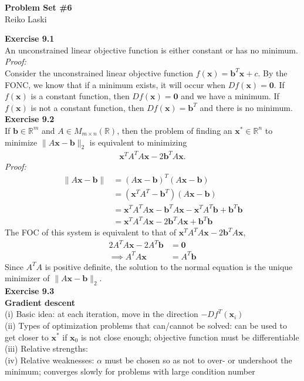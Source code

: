 \documentclass[letterpaper,12pt]{article}
\let\vec\mathbf
\theoremstyle{definition}
\begin{document}
\begin{flushleft}
  \textbf{\large{Problem Set \#6}} \\
  Reiko Laski
\end{flushleft}

\textbf{Exercise 9.1} \\
An unconstrained linear objective function is either constant or has no minimum. \\
\textit{Proof:} \\
Consider the unconstrained linear objective function $f(\vec{x})=\vec{b}^T\vec{x} + c$. By the FONC, we know that if a minimum exists, it will occur when $Df(\vec{x}) = \vec{0}$. If $f(\vec{x})$ is a constant function, then $Df(\vec{x}) = \vec{0}$ and we have a minimum. If $f(\vec{x})$ is not a constant function, then $Df(\vec{x}) = \vec{b}^T$ and there is no minimum. \\

\textbf{Exercise 9.2} \\
If $\vec{b} \in \mathbb{R}^m$ and $A \in M_{m \times n}(\mathbb{R})$, then the problem of finding an $\vec{x}^* \in \mathbb{R}^n$ to minimize $\|A\vec{x} - \vec{b}\|_2$ is equivalent to minimizing
\begin{align*}
  \vec{x}^TA^TA\vec{x} - 2\vec{b}^TA\vec{x}.
\end{align*}
\textit{Proof:}
\begin{align*}
  \|A\vec{x} - \vec{b}\| &= (A\vec{x} - \vec{b})^T(A\vec{x} - \vec{b})
  \\
  &= (\vec{x}^TA^T - \vec{b}^T)(A\vec{x} - \vec{b})
  \\
  &= \vec{x}^TA^TA\vec{x} - \vec{b}^TA\vec{x} -\vec{x}^TA^T\vec{b} + \vec{b}^T\vec{b}
  \\
  &= \vec{x}^TA^TA\vec{x} - 2\vec{b}^TA\vec{x} + \vec{b}^T\vec{b}
\end{align*}
The FOC of this system is equivalent to that of $\vec{x}^TA^TA\vec{x} - 2\vec{b}^TA\vec{x}$,
\begin{align*}
  2A^TA\vec{x} - 2A^T\vec{b} &= \vec{0}
  \\
  \implies A^TA\vec{x} &= A^T\vec{b}
\end{align*}
Since $A^TA$ is positive definite, the solution to the normal equation is the unique minimizer of $\|A\vec{x} - \vec{b}\|_2$. \\

\textbf{Exercise 9.3} \\
\textbf{Gradient descent} \\
(i) Basic idea: at each iteration, move in the direction $-Df^T(\vec{x}_i)$\\
(ii) Types of optimization problems that can/cannot be solved: can be used to get closer to $\vec{x}^*$ if $\vec{x}_0$ is not close enough; objective function must be differentiable \\
(iii) Relative strengths: \\
(iv) Relative weaknesses: $\alpha$ must be chosen so as not to over- or undershoot the minimum; converges slowly for problems with large condition number \\
\end{document}

